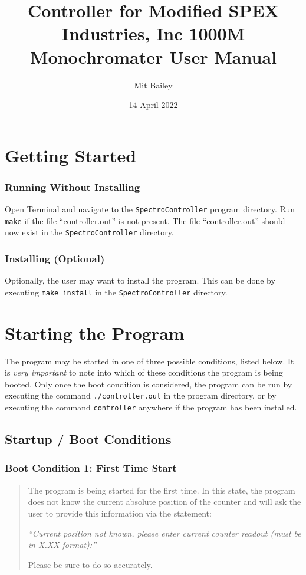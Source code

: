 \documentclass{article}
\title{Controller for Modified SPEX Industries, Inc 1000M Monochromater User Manual}
\author{Mit Bailey}
\date{14 April 2022}
\begin{document}
\maketitle
\newpage

\tableofcontents
\newpage

\section{Getting Started} \label{section:gettingstarted}

\subsubsection{Running Without Installing}
Open Terminal and navigate to the \verb|SpectroController| program directory. Run \verb|make| if the file ``controller.out'' is not present. The file ``controller.out'' should now exist in the \verb|SpectroController| directory.

\subsubsection{Installing (Optional)}
Optionally, the user may want to install the program. This can be done by executing \verb|make install| in the \verb|SpectroController| directory.

\section{Starting the Program} \label{section:startingtheprogram}

The program may be started in one of three possible conditions, listed below. It is \emph{very important} to note into which of these conditions the program is being booted. Only once the boot condition is considered, the program can be run by executing the command \verb|./controller.out| in the program directory, or by executing the command \verb|controller| anywhere if the program has been installed.

\subsection{Startup / Boot Conditions} \label{subsection:startupbootconditions}
\subsubsection{Boot Condition 1: First Time Start} \label{subsubsection:bootcon1}
\begin{quote}
    The program is being started for the first time. In this state, the program does not know the current absolute position of the counter and will ask the user to provide this information via the statement:
    
    \emph{“Current position not known, please enter current counter readout (must be in X.XX format):”}
    
    Please be sure to do so accurately.
\end{quote}
\end{document}
